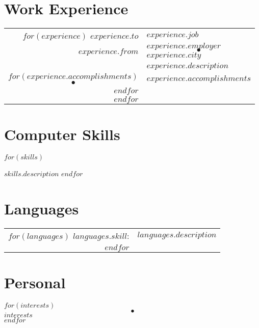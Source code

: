 \documentclass[a4paper,10pt]{article}
\begin{document}
\section{Work Experience}

\begin{tabular}{r|p{14cm}}
$for(experience)$
$experience.to$   & $experience.job$\\
$experience.from$ & \textsc{$experience.employer$}\textcolor{lightcomment}{$$~~\bullet~~$$}\textcolor{comment}{$experience.city$} \\
                  & \footnotesize{\textsf{\textbf{$experience.description$}}}\\
$for(experience.accomplishments)$ 
\textcolor{lightcomment}{$$\bullet$$} & \footnotesize{\textsf{$experience.accomplishments$}}\\
$endfor$
\multicolumn{2}{c}{} \\
$endfor$
\end{tabular}

\begin{multicols}{2}
\section{Computer Skills}
\begin{description}
$for(skills)$
\item[$skills.skill$]\textsf{$skills.description$}
$endfor$
\end{description}


\section{Languages}
\begin{tabular}{rl}
$for(languages)$
\textsc{$languages.skill$:} & $languages.description$\\
$endfor$
\end{tabular}
\end{multicols}


\section{Personal}
$for(interests)$
\textcolor{lightcomment}{$$~~\bullet~~$$}\textsf{$interests$}\\
$endfor$
\end{document}
